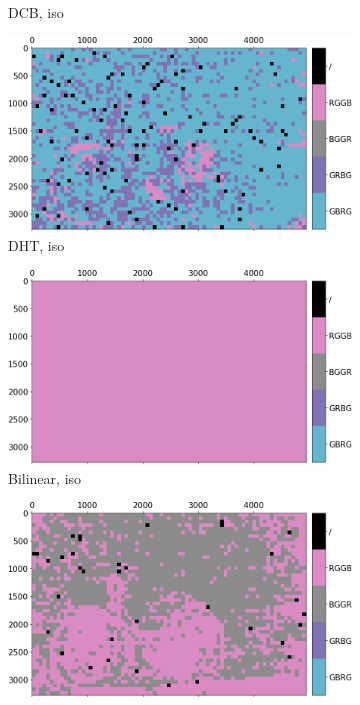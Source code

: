 \documentclass{ipol}
\begin{document}
\begin{figure}[ht]
\begin{subfigure}[c]{.14\linewidth}
\caption{DCB, iso}
\end{subfigure}%
\begin{subfigure}[c]{.14\linewidth}
\includegraphics[width=\linewidth]{images/bike/DHT/iso_64_grids.png}
\caption{DHT, iso}
\end{subfigure}%
\begin{subfigure}[c]{.14\linewidth}
\includegraphics[width=\linewidth]{images/bike/LINEAR/iso_64_grids.png}
\caption{Bilinear, iso}
\end{subfigure}%
\begin{subfigure}[c]{.14\linewidth}
\includegraphics[width=\linewidth]{images/bike/PPG/iso_64_grids.png}

\end{subfigure}
\end{figure}
\end{document}
